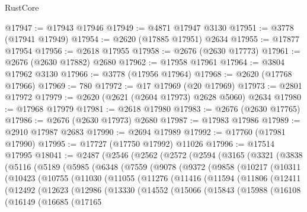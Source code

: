 \begin{lexlean}{RustCore}
\begin{coremodule}
@17947 := @17943 @17946
@17949 := @4871 @17947 @3130
@17951 := @3778 (@17941 @17949)
@17954 := @2620 (@17885 @17951) @2634
@17955 := @17877 @17954
@17956 := @2618 @17955
@17958 := @2676 (@2630 @17773)
@17961 := @2676 (@2630 @17882) @2680
@17962 := @17958 @17961
@17964 := @3804 @17962 @3130
@17966 := @3778 (@17956 @17964)
@17968 := @2620 (@17768 @17966)
@17969 := 780
@17972 := @17 @17969 (@20 @17969)
@17973 := @2801 @17972
@17979 := @2620 (@2621 (@2604 @17973) @2628 @5060) @2634
@17980 := @17968 @17979
@17981 := @2618 @17980
@17983 := @2676 (@2630 @17765)
@17986 := @2676 (@2630 @17973) @2680
@17987 := @17983 @17986
@17989 := @2910 @17987 @2683
@17990 := @2694 @17989
@17992 := @17760 (@17981 @17990)
@17995 := @17727 (@17750 @17992) @11026
@17996 := @17514 @17995
@18041 := @2487
    (@2546
      (@2562
        (@2572
          (@2594
            (@3165
              (@3321
                (@3838
                  (@5116
                    (@5189
                      (@5985
                        (@6348
                          (@7559
                            (@9078
                              (@9372
                                (@9858
                                  (@10217
                                    (@10311
                                      (@10423
                                        (@10755
                                          (@11030
                                            (@11055
                                              (@11276
                                                (@11416
                                                  (@11594
                                                    (@11806
                                                      (@12411
                                                        (@12492
                                                          (@12623
                                                            (@12986
                                                              (@13330
                                                                (@14552
                                                                  (@15066
                                                                    (@15843
                                                                      (@15988
                                                                        (@16108
                                                                          (@16149
                                                                            (@16685
                                                                              (@17165

\end{coremodule}
\end{lexlean}
